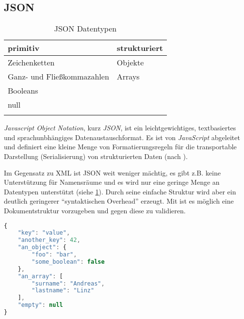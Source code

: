 \subsection{JSON}

\begin{longtable}[htb]{l l}
    \toprule
    \rowcolor{lightgray}
    \textbf{primitiv}   & \textbf{strukturiert}\\
    \midrule
    Zeichenketten       & Objekte\\
    Ganz- und 
    Fließkommazahlen    & Arrays\\
    Booleans            & \\
    null                & \\
    \bottomrule
    \caption{JSON Datentypen}
    \label{tab:jsonDatatypes}
\end{longtable}

\emph{Javascript Object Notation}, kurz \emph{JSON}, ist ein leichtgewichtiges, textbasiertes und sprachunbhängiges Datenaustauschformat. Es ist von \emph{JavaScript} abgeleitet und definiert eine kleine Menge von Formatierungsregeln für die transportable Darstellung (Serialisierung) von strukturierten Daten (nach \cite{JSONRFC}).

Im Gegensatz zu XML ist JSON weit weniger mächtig, es gibt z.B. keine Unterstützung für Namensräume und es wird nur eine geringe Menge an Datentypen unterstützt (siehe \cref{tab:jsonDatatypes}). 
Durch seine einfache Struktur wird aber ein deutlich geringerer \enquote{syntaktischen Overhead} erzeugt.
Mit  ist es möglich eine Dokumentstruktur vorzugeben und gegen diese zu validieren. 

%
%
\begin{minipage}{\textwidth}
    \begin{lstlisting}[language=JavaScript, caption=Minimalbeispiel für eine JSON-Datei]
{
    "key": "value",
    "another_key": 42,
    "an_object": {
        "foo": "bar",
        "some_boolean": false
    },
    "an_array": [
        "surname": "Andreas",
        "lastname": "Linz"
    ],
    "empty": null
}
    \end{lstlisting}
\end{minipage}